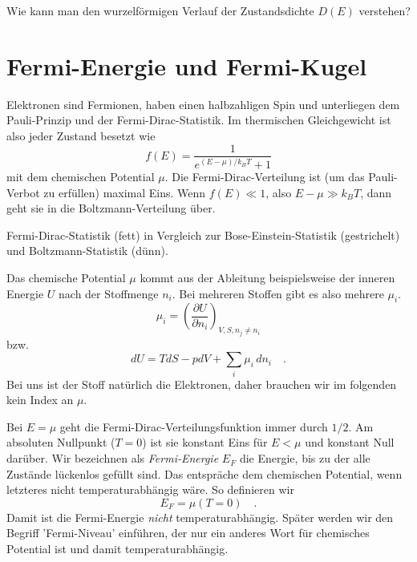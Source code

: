 \begin{questions} 
    \item Wie kann man den wurzelförmigen Verlauf der Zustandsdichte $D(E)$ verstehen?
\end{questions}


\section*{Fermi-Energie und Fermi-Kugel}

Elektronen sind Fermionen, haben einen halbzahligen Spin und unterliegen  dem Pauli-Prinzip und der Fermi-Dirac-Statistik. Im thermischen Gleichgewicht ist also jeder Zustand besetzt wie 
\begin{equation}
    f(E) = \frac{1}{e^{(E-\mu)/k_B T} + 1}
\end{equation}
mit dem chemischen Potential $\mu$. Die Fermi-Dirac-Verteilung ist (um das Pauli-Verbot zu erfüllen) maximal Eins. Wenn $f(E) \ll 1$, also $E- \mu \gg k_B T$, dann geht sie in die Boltzmann-Verteilung über.

\begin{marginfigure}
    \caption{Fermi-Dirac-Statistik (fett) in Vergleich zur Bose-Einstein-Statistik (gestrichelt) und Boltzmann-Statistik (dünn).}
\end{marginfigure}

Das chemische Potential $\mu$ kommt aus der Ableitung beispielsweise der inneren Energie $U$ nach der Stoffmenge $n_i$. Bei mehreren Stoffen gibt es also mehrere $\mu_i$.
\begin{equation}
    \mu_i = \left( \frac{\partial U}{\partial n_i} \right)_{V,S,n_j \neq n_i}
\end{equation}
bzw.
\begin{equation}
    dU = T dS - p dV + \sum_i \mu_i \, d n_i \quad .
\end{equation}
Bei uns ist der Stoff natürlich die Elektronen, daher brauchen wir im folgenden kein Index an $\mu$.

Bei $E = \mu$ geht die Fermi-Dirac-Verteilungsfunktion immer durch $1/2$. Am absoluten Nullpunkt ($T=0$) ist sie konstant Eins für $E < \mu$ und konstant Null darüber. Wir bezeichnen als \emph{Fermi-Energie} $E_F$ die Energie, bis zu der alle Zustände lückenlos gefüllt sind. Das entspräche dem chemischen Potential, wenn letzteres nicht temperaturabhängig wäre. So definieren wir
\begin{equation}
    E_F = \mu (T = 0) \quad .
\end{equation}
Damit ist die Fermi-Energie \emph{nicht} temperaturabhängig. Später werden wir den Begriff 'Fermi-Niveau' einführen, der nur ein anderes Wort für chemisches Potential ist und damit temperaturabhängig.


